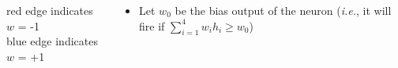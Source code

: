 \documentclass[serif, aspectratio=169]{beamer}
\begin{document}
\begin{frame}
\begin{columns}
\begin{overlayarea}{\textwidth}{\textheight}
			red edge indicates $w$ = -1 \\
			blue edge indicates $w$ = +1


		\end{overlayarea}

		\begin{overlayarea}{\textwidth}{\textheight}

			\begin{itemize}\justifying
				\item Let $w_0$ be the bias output of the neuron (\textit{i.e.}, it will fire if $\sum_{i=1}^{4}w_ih_i \geq w_0$)
			\end{itemize}


\end{overlayarea}
\end{columns}
\end{frame}
\end{document}
